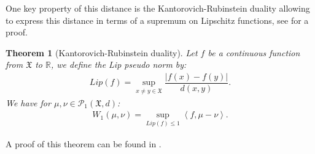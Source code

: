 \documentclass[11pt,a4paper]{article}
\newcommand{\RR}{\mathbb{R}}
\newcommand{\XF}{\mathfrak{X}}
\newcommand{\brac}[1]{\left\langle#1\right\rangle}
\newtheorem{theorem}{Theorem}[section]
\begin{document}
One key property of this distance is the Kantorovich-Rubinstein duality allowing to express this distance in terms of a supremum on Lipschitz functions, see \cite{santambrogio2015optimal} for a proof.
\begin{theorem}[Kantorovich-Rubinstein duality]
    Let $f$ be a continuous function from $\XF$ to $\RR$, we define the Lip pseudo norm by:
    \begin{align*}
        Lip(f) = \sup\limits_{x \neq y \in \XF} \dfrac{\left|f(x) - f(y) \right|}{d(x,y)} .
    \end{align*}
    We have for $\mu,\nu \in \mathcal{P}_1(\XF,d)$:
    \begin{align*}
        W_1(\mu,\nu) = \sup\limits_{Lip(f) \leq 1} \brac{f,\mu - \nu}.
    \end{align*}
\end{theorem}
A proof of this theorem can be found in \cite{santambrogio2015optimal}. 
\end{document}
